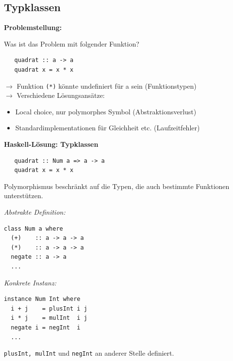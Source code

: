 \documentclass[unknownkeysallowed]{beamer}
\begin{document}
  
  \begin{frame}[fragile]
  \subsection{Typklassen}
  \Large\textbf{Problemstellung:}\bigskip \normalsize

  Was ist das Problem mit folgender Funktion?

  \begin{verbatim}
   quadrat :: a -> a
   quadrat x = x * x
  \end{verbatim}
  
  \bigskip
  \pause
  
  $\to$ Funktion \texttt{(*)} könnte undefiniert für a sein (Funktionstypen) \\ \pause
  $\to$ Verschiedene Lösungsansätze: \pause
  
  \begin{itemize}
  \item \glqq Local choice\grqq , nur polymorphes Symbol (Abstraktionsverlust) \pause
  \item Standardimplementationen für Gleichheit etc. (Laufzeitfehler)
  \end{itemize}
\end{frame}

  
  \begin{frame}[fragile]
  
  \Large\textbf{Haskell-Lösung: Typklassen} \normalsize

  \begin{verbatim}
   quadrat :: Num a => a -> a
   quadrat x = x * x
  \end{verbatim}
  
  Polymorphismus beschränkt auf die Typen, die auch bestimmte Funktionen unterstützen.\pause  
  \begin{multicols}{2}
  \emph{Abstrakte Definition:}
  
  \begin{verbatim}
class Num a where
  (+)    :: a -> a -> a
  (*)    :: a -> a -> a
  negate :: a -> a
  ...
  \end{verbatim}

  \vfill \vfill  
  
  \pause
  \columnbreak  
  \emph{Konkrete Instanz:}
  
  \begin{verbatim}
instance Num Int where
  i + j    = plusInt i j
  i * j    = mulInt  i j 
  negate i = negInt  i
  ... 
  \end{verbatim}
  \pause
  \texttt{plusInt, mulInt} und \texttt{negInt} an anderer Stelle definiert.
  \end{multicols}  
  
\end{frame}
\end{document}
